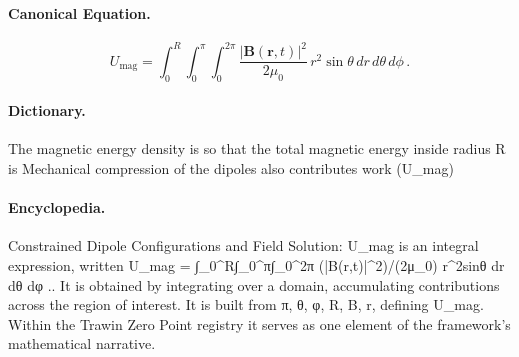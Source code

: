 \paragraph{Canonical Equation.}
\[
U_{\mathrm{mag}} = \int_0^R\int_0^\pi\int_0^{2\pi} \frac{|\mathbf{B}(\mathbf{r},t)|^2}{2\mu_0}\,r^2\sin\theta\,dr\,d\theta\,d\phi\,.
\]

\paragraph{Dictionary.}
The magnetic energy density is so that the total magnetic energy inside radius R is Mechanical compression of the dipoles also contributes work (U\_mag)

\paragraph{Encyclopedia.}
Constrained Dipole Configurations and Field Solution: U\_mag is an integral expression, written U\_mag = ∫\_0\textasciicircum{}R∫\_0\textasciicircum{}π∫\_0\textasciicircum{}2π (|B(r,t)|\textasciicircum{}2)/(2μ\_0) r\textasciicircum{}2sinθ dr dθ dφ .. It is obtained by integrating over a domain, accumulating contributions across the region of interest. It is built from π, θ, φ, R, B, r, defining U\_mag. Within the Trawin Zero Point registry it serves as one element of the framework's mathematical narrative.
